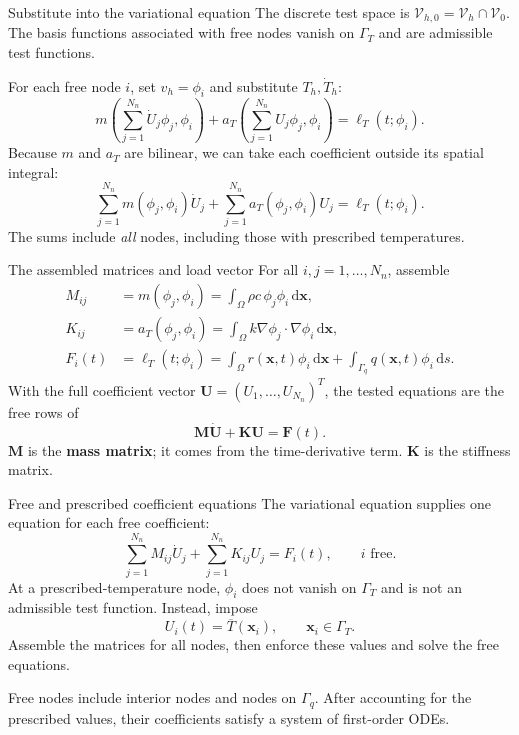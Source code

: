 \documentclass[11pt,aspectratio=169]{beamer}
\newcommand{\dd}{\mathrm d}
\newcommand{\bU}{\bm U}
\newcommand{\bx}{\bm x}
\newcommand{\bM}{\bm M}
\newcommand{\bK}{\bm K}
\newcommand{\bF}{\bm F}
\newcommand{\Vzero}{\mathcal V_0}
\newcommand{\Vhzero}{\mathcal V_{h,0}}
\begin{document}
\begin{frame}{Substitute into the variational equation}
The discrete test space is $\Vhzero=\mathcal V_h\cap\Vzero$.
The basis functions associated with free nodes vanish on $\Gamma_T$ and
are admissible test functions.
\medskip

For each free node $i$, set $v_h=\phi_i$ and substitute $T_h,\dot T_h$:
\[
m\left(\sum_{j=1}^{N_n}\dot U_j\phi_j,\phi_i\right)
+a_T\left(\sum_{j=1}^{N_n}U_j\phi_j,\phi_i\right)
=\ell_T(t;\phi_i).
\]
Because $m$ and $a_T$ are bilinear, we can take each coefficient outside its spatial integral:
\[
\boxed{
\sum_{j=1}^{N_n}m(\phi_j,\phi_i)\dot U_j
+\sum_{j=1}^{N_n}a_T(\phi_j,\phi_i)U_j
=\ell_T(t;\phi_i).}
\]
The sums include \emph{all} nodes, including those with prescribed temperatures.
\end{frame}

\begin{frame}{The assembled matrices and load vector}
For all $i,j=1,\ldots,N_n$, assemble
\[
\begin{aligned}
M_{ij}&=m(\phi_j,\phi_i)=\int_\Omega\rho c\,\phi_j\phi_i\,\dd\bx,\\
K_{ij}&=a_T(\phi_j,\phi_i)=\int_\Omega k\nabla\phi_j\cdot\nabla\phi_i\,\dd\bx,\\
F_i(t)&=\ell_T(t;\phi_i)=\int_\Omega r(\bx,t)\phi_i\,\dd\bx
+\int_{\Gamma_q}q(\bx,t)\phi_i\,\dd s.
\end{aligned}
\]
With the full coefficient vector $\bU=(U_1,\ldots,U_{N_n})^T$,
the tested equations are the free rows of
\[
\boxed{\bM\dot{\bU}+\bK\bU=\bF(t).}
\]
$\bM$ is the \textbf{mass matrix}; it comes from the time-derivative term.
$\bK$ is the stiffness matrix.
\end{frame}

\begin{frame}{Free and prescribed coefficient equations}
The variational equation supplies one equation for each free coefficient:
\[
\sum_{j=1}^{N_n}M_{ij}\dot U_j+\sum_{j=1}^{N_n}K_{ij}U_j=F_i(t),
\qquad i\text{ free}.
\]
At a prescribed-temperature node, $\phi_i$ does not vanish on $\Gamma_T$ and
is not an admissible test function. Instead, impose
\[
\boxed{U_i(t)=\overline T(\bx_i),\qquad \bx_i\in\Gamma_T.}
\]
Assemble the matrices for all nodes, then enforce these values and solve the
free equations.
\medskip

Free nodes include interior nodes and nodes on $\Gamma_q$.
After accounting for the prescribed values, their coefficients
satisfy a system of first-order ODEs.
\end{frame}
\end{document}
